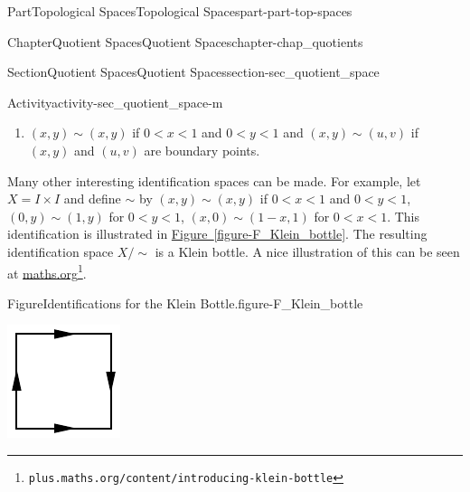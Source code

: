 \documentclass[oneside,10pt,]{book}
\newcommand{\xreffont}{\relax}
\numberwithin{equation}{chapter}
\newcommand{\ssim}{\sim}
\newcommand{\lt}{<}
\begin{document}
\begin{partptx}{Part}{Topological Spaces}{}{Topological Spaces}{}{}{part-part-top-spaces}
\begin{chapterptx}{Chapter}{Quotient Spaces}{}{Quotient Spaces}{}{}{chapter-chap_quotients}
\begin{sectionptx}{Section}{Quotient Spaces}{}{Quotient Spaces}{}{}{section-sec_quotient_space}
\begin{activity}{Activity}{}{activity-sec_quotient_space-m}
\begin{enumerate}[font=\bfseries,label=(\alph*),ref=\alph*]
\begin{enumerate}[font=\bfseries,label=(\roman*),ref=\theenumi.\roman*]
\item{}\((x, y) \sim (x,y)\) if \(0 \lt x \lt 1\) and \(0 \lt y \lt 1\) and \((x,y) \sim (u,v)\) if \((x,y)\) and \((u,v)\) are boundary points.%
\end{enumerate}%
\end{enumerate}%
\end{activity}%
 Many other interesting identification spaces can be made. For example, let \(X = I \times I\) and define \(\sim\) by \((x, y) \sim (x,y)\) if \(0 \lt x \lt 1\) and \(0 \lt y \lt 1\), \((0, y) \sim (1, y)\) for \(0 \lt y \lt 1\), \((x,0) \sim (1-x,1)\) for \(0 \lt x \lt 1\). This identification is illustrated in \hyperref[figure-F_Klein_bottle]{Figure~{\xreffont\ref{figure-F_Klein_bottle}}}. The resulting identification space \(X/\ssim\) is a Klein bottle. A nice illustration of this can be seen at \href{https://plus.maths.org/content/introducing-klein-bottle}{maths.org}\footnote{\nolinkurl{plus.maths.org/content/introducing-klein-bottle}\label{fn-sec_quotient_space-n-n}}.%
\begin{figureptx}{Figure}{Identifications for the Klein Bottle.}{figure-F_Klein_bottle}{}%
\begin{image}{0.3}{0.4}{0.3}{}%
\includegraphics[width=\linewidth]{external/Klein_identification.pdf}
\end{image}%

\end{figureptx}
\end{sectionptx}
\end{chapterptx}
\end{partptx}
\end{document}
